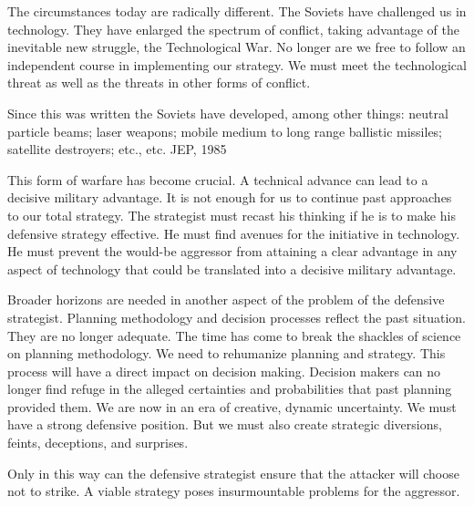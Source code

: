 The circumstances today are radically different. The Soviets have challenged us in technology. They have enlarged the spectrum of conflict, taking advantage of the inevitable new struggle, the Technological War. No longer are we free to follow an independent course in implementing our strategy. We must meet the technological threat as well as the threats in other forms of conflict.

\begin{mdframed}[backgroundcolor=black!10]
Since this was written the Soviets have developed, among other things: neutral particle beams; laser weapons; mobile medium to long range ballistic missiles; satellite destroyers; etc., etc. JEP, 1985
\end{mdframed}

This form of warfare has become crucial. A technical advance can lead to a decisive military advantage. It is not enough for us to continue past approaches to our total strategy. The strategist must recast his thinking if he is to make his defensive strategy effective. He must find avenues for the initiative in technology. He must prevent the would-be aggressor from attaining a clear advantage in any aspect of technology that could be translated into a decisive military advantage.

Broader horizons are needed in another aspect of the problem of the defensive strategist. Planning methodology and decision processes reflect the past situation. They are no longer adequate. The time has come to break the shackles of science on planning methodology. We need to rehumanize planning and strategy. This process will have a direct impact on decision making. Decision makers can no longer find refuge in the alleged certainties and probabilities that past planning provided them. We are now in an era of creative, dynamic uncertainty. We must have a strong defensive position. But we must also create strategic diversions, feints, deceptions, and surprises.

Only in this way can the defensive strategist ensure that the attacker will choose not to strike. A viable strategy poses insurmountable problems for the aggressor.

